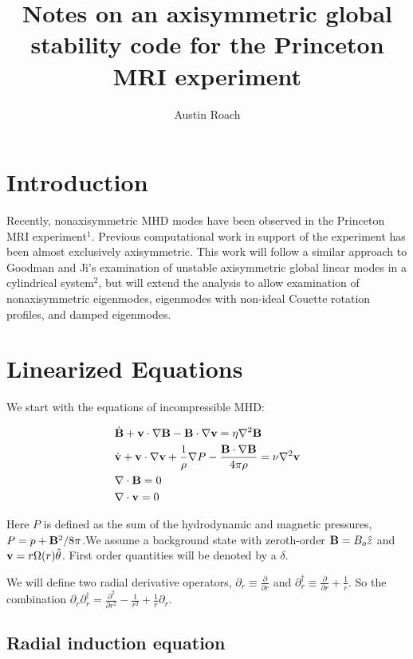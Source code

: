 \documentclass[letterpaper]{article}
\title{Notes on an axisymmetric global stability code for the Princeton MRI experiment}
\author{Austin Roach}
\begin{document}
\maketitle{}

\section{Introduction}

Recently, nonaxisymmetric MHD modes have been observed in the Princeton MRI experiment$^1$.  Previous computational work in support of the experiment has been almost exclusively axisymmetric.  This work will follow a similar approach to Goodman and Ji's examination of unstable axisymmetric global linear modes in a cylindrical system$^2$, but will extend the analysis to allow examination of nonaxisymmetric eigenmodes, eigenmodes with non-ideal Couette rotation profiles, and damped eigenmodes.

\section{Linearized Equations}

We start with the equations of incompressible MHD:

\begin{align}
&\dot{{\bf B}} + {\bf v}\cdot\nabla{\bf B} - {\bf B}\cdot\nabla{\bf v}=\eta\nabla^2 {\bf B}
\\
&\dot{{\bf v}}+{\bf v}\cdot\nabla{\bf v}+\frac{1}{\rho}\nabla{P}-\frac{{\bf B}\cdot\nabla{\bf B}}{4\pi\rho}=\nu\nabla^2{\bf v}
\\
&\nabla\cdot{\bf B}=0
\\
&\nabla\cdot{\bf v}=0
\end{align}

Here $P$ is defined as the sum of the hydrodynamic and magnetic pressures, $P=p+{\bf B}^2/8\pi$.We assume a background state with zeroth-order ${\bf B}=B_o \hat{z}$ and ${\bf v}=r\Omega(r)\hat{\theta}$.  First order quantities will be denoted by a $\delta$.

We will define two radial derivative operators, $\partial_r \equiv \frac{\partial}{\partial r}$ and $\partial_{r}^\dagger \equiv \frac{\partial}{\partial r}+\frac{1}{r}$.  So the combination $\partial_r \partial_r^\dagger = \frac{\partial^2}{\partial r^2}-\frac{1}{r^2}+\frac{1}{r}\partial_r$.

\subsection{Radial induction equation}
\end{document}
